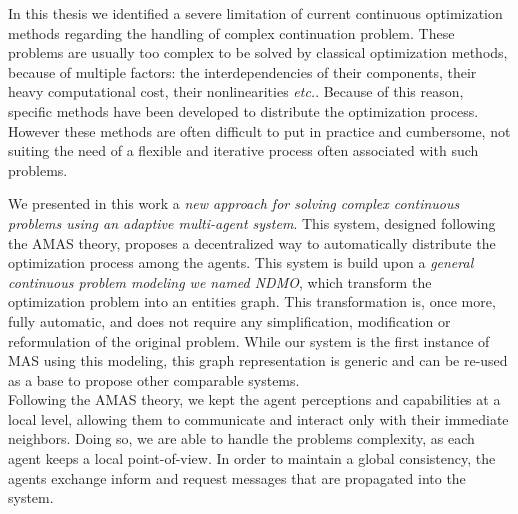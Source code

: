
In this thesis we identified a severe limitation of current continuous optimization methods regarding the handling of complex continuation problem. These problems are usually  too complex to be solved by classical optimization methods, because of multiple factors: the interdependencies of their components, their heavy computational cost, their nonlinearities \emph{etc.}. Because of this reason, specific methods have been developed to distribute the optimization process. However these methods are often difficult to put in practice and cumbersome, not suiting the need of a flexible and iterative process often associated with such problems.

We presented in this work a \emph{new approach for solving complex continuous problems using an adaptive multi-agent system}. This system, designed following the AMAS theory, proposes a decentralized way to automatically distribute the optimization process among the agents. This system is build upon a \emph{general continuous problem modeling we named NDMO}, which transform the optimization problem into an entities graph. This transformation is, once more, fully automatic, and does not require any simplification, modification or reformulation of the original problem. While our system is the first instance of MAS using this modeling, this graph representation is generic and can be re-used as a base to propose other comparable systems.\\
Following the AMAS theory, we kept the agent perceptions and capabilities at a local level, allowing them to communicate and interact only with their immediate neighbors. Doing so, we are able to handle the problems complexity, as each agent keeps a local point-of-view. In order to maintain a global consistency, the agents exchange inform and request messages that are propagated into the system.

